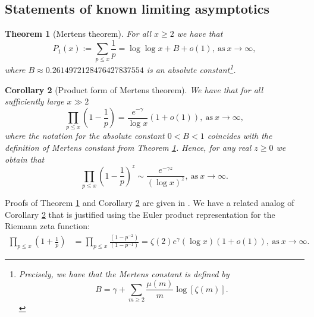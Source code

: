 \documentclass[11pt,reqno,a4letter]{article}
\numberwithin{figure}{section}
\numberwithin{table}{section}
\newcommand{\seqnum}[1]{\href{http://oeis.org/#1}{\color{ProcessBlue}{\underline{#1}}}}
\theoremstyle{plain}
\newtheorem{theorem}{Theorem}
\newtheorem{cor}[theorem]{Corollary}
\numberwithin{theorem}{section}
\theoremstyle{definition}
\begin{document}
\subsection{Statements of known limiting asymptotics} 
\label{subSection_OtherFactsAndResults} 

\begin{theorem}[Mertens theorem]
\label{theorem_Mertens_theorem} 
For all $x \geq 2$ we have that 
\[
P_1(x) := \sum_{p \leq x} \frac{1}{p} = \log\log x + B + o(1), 
     \mathrm{\ as\ } x \rightarrow \infty, 
\]
where 
$B \approx 0.2614972128476427837554$ 
is an absolute constant\footnote{ 
     Precisely, we have that the \emph{Mertens constant} is defined by 
     \cite[\seqnum{A077761}]{OEIS} 
     \[
     B = \gamma + \sum_{m \geq 2} \frac{\mu(m)}{m} \log\left[\zeta(m)\right]. 
     \]
}.
\end{theorem} 

\begin{cor}[Product form of Mertens theorem] 
\label{lemma_Gz_productTermV2} 
We have that for all sufficiently large $x \gg 2$ 
\[
\prod_{p \leq x} \left(1 - \frac{1}{p}\right) = \frac{e^{-\gamma}}{\log x}\left( 
     1 + o(1)\right), \mathrm{\ as\ } x \rightarrow \infty, 
\]
where the notation for the absolute constant $0 < B < 1$ coincides with the definition of 
Mertens constant from Theorem \ref{theorem_Mertens_theorem}. 
Hence, for any real $z \geq 0$ we obtain that 
\[
\prod_{p \leq x} \left(1 - \frac{1}{p}\right)^{z} \sim 
     \frac{e^{-\gamma z}}{(\log x)^{z}}, \mathrm{\ as\ } x \rightarrow \infty. 
\]
\end{cor} 

Proofs of Theorem \ref{theorem_Mertens_theorem} and 
Corollary \ref{lemma_Gz_productTermV2} are given in 
\cite[\S 22.7; \S 22.8]{HARDYWRIGHT}. 
We have a related analog of Corollary \ref{lemma_Gz_productTermV2} 
that is justified using the Euler product representation for the 
Riemann zeta function: 
\begin{align*} 
\prod_{p \leq x} \left(1 + \frac{1}{p}\right) & = \prod_{p \leq x} 
     \frac{\left(1 - p^{-2}\right)}{\left(1 - p^{-1}\right)} 
     = \zeta(2) e^{\gamma} (\log x) (1 + o(1)), 
     \mathrm{\ as\ } x \rightarrow \infty. 
\end{align*} 
\end{document}
